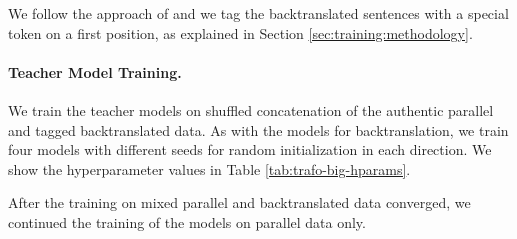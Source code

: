 We follow the approach of \citet{caswell-etal-2019-tagged} and we tag the
backtranslated sentences with a special token on a first position, as explained
in Section \ref{sec:training:methodology}.

\paragraph{Teacher Model Training.}  We train the teacher models on shuffled
concatenation of the authentic parallel and tagged backtranslated data. As with
the models for backtranslation, we train four models with different seeds for
random initialization in each direction. We show the hyperparameter values in
Table \ref{tab:trafo-big-hparams}.

After the training on mixed parallel and backtranslated data converged, we
continued the training of the models on parallel data only.

